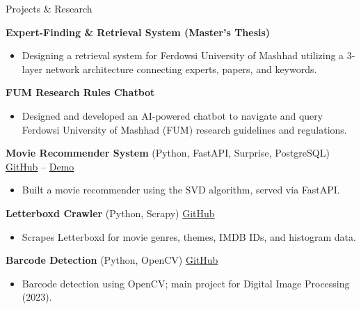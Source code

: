 \documentclass{resume}
\begin{document}
\begin{rSection}{Projects \& Research}
\vspace{-1.25em}
\item \textbf{Expert-Finding \& Retrieval System (Master's Thesis)}
\begin{itemize}
    \itemsep -3pt
    \item Designing a retrieval system for Ferdowsi University of Mashhad utilizing a 3-layer network architecture connecting experts, papers, and keywords.
\end{itemize}


\item \textbf{FUM Research Rules Chatbot}
\begin{itemize}
    \itemsep -3pt
    \item Designed and developed an AI-powered chatbot to navigate and query Ferdowsi University of Mashhad (FUM) research guidelines and regulations.
\end{itemize}

\item \textbf{Movie Recommender System} (Python, FastAPI, Surprise, PostgreSQL) \hfill \href{https://github.com/behzadsabeti/movie_recommender}{GitHub} – \href{https://movierecommender-production-5344.up.railway.app/}{Demo}
\begin{itemize}
    \itemsep -3pt
    \item Built a movie recommender using the SVD algorithm, served via FastAPI.
\end{itemize}

\item \textbf{Letterboxd Crawler} (Python, Scrapy) \hfill \href{https://github.com/behzadsabeti/LetterboxdCrawler}{GitHub}
\begin{itemize}
    \itemsep -3pt
    \item Scrapes Letterboxd for movie genres, themes, IMDB IDs, and histogram data.
\end{itemize}

\item \textbf{Barcode Detection} (Python, OpenCV) \hfill \href{https://github.com/behzadsabeti/barcode_detection}{GitHub}
\begin{itemize}
    \itemsep -3pt
    \item Barcode detection using OpenCV; main project for Digital Image Processing (2023).
\end{itemize}


\end{rSection}
\end{document}
